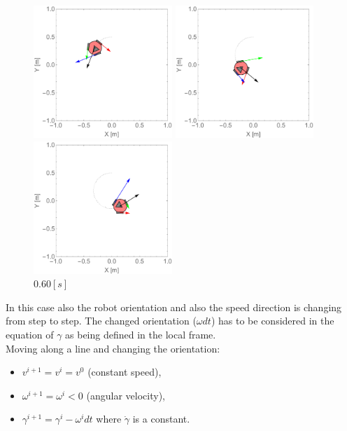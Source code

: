 \documentclass[12pt,english]{article}
\begin{document}
\begin{figure}[htb!]
	\centering
	\includegraphics[height=5cm]{figures/2d_simulation/animations/2D_move_along_circle_rotating_reverse_direction/20}
	\caption{$0.20[s]$}
	\endminipage\hfill
	\centering
	\includegraphics[height=5cm]{figures/2d_simulation/animations/2D_move_along_circle_rotating_reverse_direction/40}
	\caption{$0.40[s]$}
	\endminipage\hfill
	\centering
	\includegraphics[height=5cm]{figures/2d_simulation/animations/2D_move_along_circle_rotating_reverse_direction/60}
	\caption{$0.60[s]$}
	\endminipage\hfill
\end{figure}
In this case also the robot orientation and also the speed direction is changing from step to step. The changed orientation ($\omega dt$) has to be considered in the equation of $\gamma$ as being defined in the local frame.\\[0.3cm] 
\noindent Moving along a line and changing the orientation:
\begin{itemize}
	\item $v^{i+1} = v^{i} = v^{0}$ (constant speed),
	\item $\omega^{i+1} = \omega^{i}<0$ (angular velocity),
	\item $\gamma^{i+1} = \gamma^i -\omega^i dt$ where $\dot \gamma$ is a constant.
\end{itemize}
\end{document}
